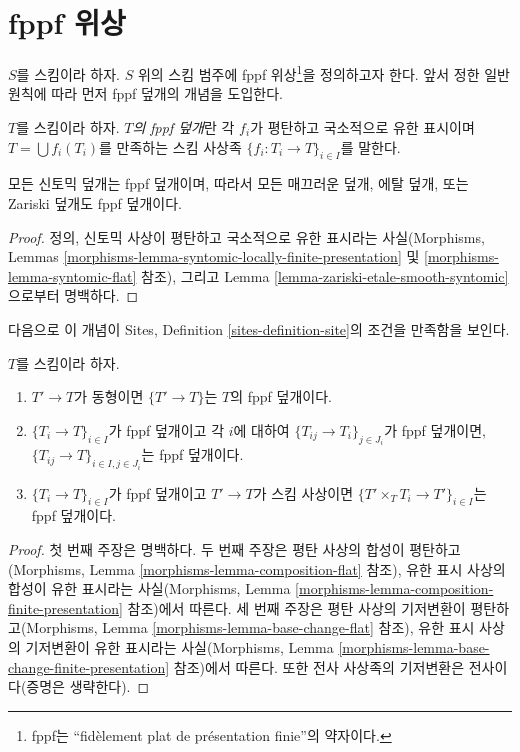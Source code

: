 \section{fppf 위상}
\label{section-fppf}

\noindent
$S$를 스킴이라 하자. $S$ 위의 스킴 범주에 fppf 위상\footnote{fppf는
``fid\`element plat de pr\'esentation finie''의 약자이다.}을 정의하고자
한다. 앞서 정한 일반 원칙에 따라 먼저 fppf 덮개의 개념을 도입한다.

\begin{definition}
\label{definition-fppf-covering}
$T$를 스킴이라 하자. {\it $T$의 fppf 덮개}란 각 $f_i$가 평탄하고
국소적으로 유한 표시이며 $T = \bigcup f_i(T_i)$를 만족하는 스킴 사상족
$\{f_i : T_i \to T\}_{i \in I}$를 말한다.
\end{definition}

\begin{lemma}
\label{lemma-zariski-etale-smooth-syntomic-fppf}
모든 신토믹 덮개는 fppf 덮개이며, 따라서 모든 매끄러운 덮개, 에탈
덮개, 또는 Zariski 덮개도 fppf 덮개이다.
\end{lemma}

\begin{proof}
정의, 신토믹 사상이 평탄하고 국소적으로 유한 표시라는 사실(Morphisms,
Lemmas \ref{morphisms-lemma-syntomic-locally-finite-presentation} 및
\ref{morphisms-lemma-syntomic-flat} 참조), 그리고 Lemma
\ref{lemma-zariski-etale-smooth-syntomic}으로부터 명백하다.
\end{proof}

\noindent
다음으로 이 개념이 Sites, Definition \ref{sites-definition-site}의
조건을 만족함을 보인다.

\begin{lemma}
\label{lemma-fppf}
$T$를 스킴이라 하자.
\begin{enumerate}
\item $T' \to T$가 동형이면 $\{T' \to T\}$는 $T$의 fppf 덮개이다.
\item $\{T_i \to T\}_{i\in I}$가 fppf 덮개이고 각 $i$에 대하여
$\{T_{ij} \to T_i\}_{j\in J_i}$가 fppf 덮개이면,
$\{T_{ij} \to T\}_{i \in I, j\in J_i}$는 fppf 덮개이다.
\item $\{T_i \to T\}_{i\in I}$가 fppf 덮개이고 $T' \to T$가 스킴
사상이면 $\{T' \times_T T_i \to T'\}_{i\in I}$는 fppf 덮개이다.
\end{enumerate}
\end{lemma}

\begin{proof}
첫 번째 주장은 명백하다. 두 번째 주장은 평탄 사상의 합성이 평탄하고
(Morphisms, Lemma \ref{morphisms-lemma-composition-flat} 참조), 유한 표시
사상의 합성이 유한 표시라는 사실(Morphisms, Lemma
\ref{morphisms-lemma-composition-finite-presentation} 참조)에서 따른다.
세 번째 주장은 평탄 사상의 기저변환이 평탄하고(Morphisms, Lemma
\ref{morphisms-lemma-base-change-flat} 참조), 유한 표시 사상의 기저변환이
유한 표시라는 사실(Morphisms, Lemma
\ref{morphisms-lemma-base-change-finite-presentation} 참조)에서 따른다.
또한 전사 사상족의 기저변환은 전사이다(증명은 생략한다).
\end{proof}

